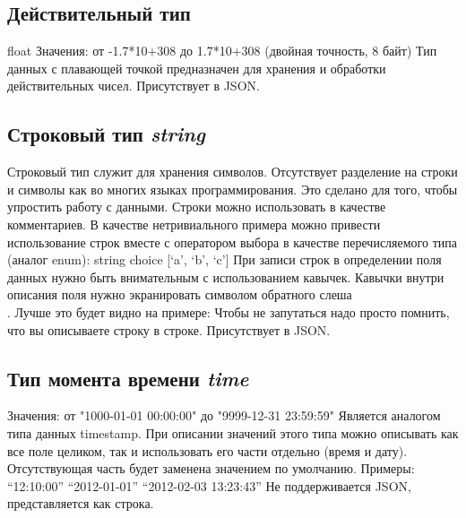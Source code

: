 {{\subsection{Действительный тип}
float
Значения: от -1.7*10+308 до 1.7*10+308 (двойная точность, 8 байт)
Тип данных с плавающей точкой предназначен для хранения и обработки действительных чисел.
Присутствует в JSON.

\subsection{Строковый тип \emph{string}}
Строковый тип служит для хранения символов. Отсутствует разделение на строки и символы как во многих языках программирования. Это сделано для того, чтобы упростить работу с данными. Строки можно использовать в качестве комментариев. В качестве нетривиального примера можно привести использование строк вместе с оператором выбора в качестве перечисляемого типа (аналог enum):
        string choice [‘a’, ‘b’, ‘c’]
При записи строк в определении поля данных нужно быть внимательным с использованием кавычек. Кавычки внутри описания поля нужно экранировать символом обратного слеша \\. Лучше это будет видно на примере:
Чтобы не запутаться надо просто помнить, что вы описываете строку в строке.
Присутствует в JSON.

\subsection{Тип момента времени \emph{time}}
Значения: от "1000-01-01 00:00:00" до "9999-12-31 23:59:59"
Является аналогом типа данных timestamp. При описании значений этого типа можно описывать как все поле целиком, так и использовать его части отдельно (время и дату). Отсутствующая часть будет заменена значением по умолчанию. Примеры:
        “12:10:00”
        “2012-01-01”
        “2012-02-03 13:23:43”
Не поддерживается JSON, представляется как строка.

}}
